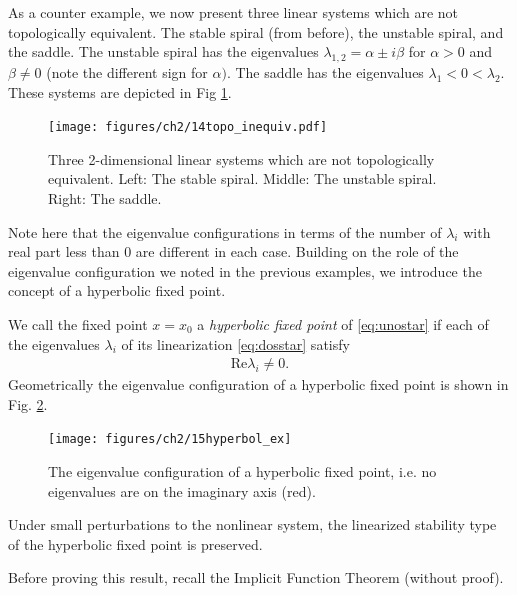 \begin{ex}[Topologically inequivalent linear systems for $n=2$]
	As a counter example, we now present three linear systems which are not topologically equivalent. The stable spiral (from before), the unstable spiral, and the saddle. The unstable spiral has the eigenvalues $\lambda _{1,2}= \alpha \pm i \beta $ for $\alpha > 0$ and $\beta \neq 0$ (note the different sign for $\alpha)$. The saddle has the eigenvalues $\lambda _1 < 0 < \lambda_2$. These systems are depicted in Fig \ref{fig:topo_inequiv}.
	\begin{figure}[h!]
		\centering
		\texttt{[image: figures/ch2/14topo\_inequiv.pdf]}
		\caption{Three 2-dimensional linear systems which are not topologically equivalent. Left: The stable spiral. Middle: The unstable spiral. Right: The saddle.}
		\label{fig:topo_inequiv}
	\end{figure}

	Note here that the eigenvalue configurations in terms of the number of $\lambda _i$ with real part less than $0$ are different in each case.
Building on the role of the eigenvalue configuration we noted in the previous examples, we introduce the concept of a hyperbolic fixed point.
\end{ex}
\begin{definition}
	We call the fixed point  ${x} ={x_0} $ a \emph{hyperbolic fixed point} of \eqref{eq:unostar} if each of the eigenvalues $\lambda_i$ of its linearization \eqref{eq:dosstar} satisfy
	\begin{align}
		\boxed{ \textrm{Re} \lambda_i \neq 0.}
	\end{align}
	Geometrically the eigenvalue configuration of a hyperbolic fixed point is shown in Fig. \ref{fig:hyperbol_ex}.
	\begin{figure}[h!]
		\centering
		\texttt{[image: figures/ch2/15hyperbol\_ex]}
		\caption{The eigenvalue configuration of a hyperbolic fixed point, i.e. no eigenvalues are on the imaginary axis (red).}
		\label{fig:hyperbol_ex}
	\end{figure}
\end{definition}
	
\begin{proposition}[]
	Under small perturbations to the nonlinear system, the linearized stability type of the hyperbolic fixed point is preserved.
\end{proposition}
Before proving this result, recall the Implicit Function Theorem (without proof).

